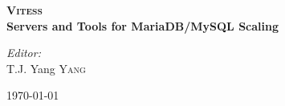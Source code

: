 \begin{titlepage}
 
\begin{center}
 
 
\textsc{\huge \bfseries Vitess}\\[4.5cm]

 
 
 

{ \large  \bfseries Servers and Tools for MariaDB/MySQL Scaling}
\\[8.0cm]
 
 
\begin{minipage}{0.4\textwidth}
\begin{center} \large
\emph{Editor:}\\
T.J. Yang \textsc{Yang}
\end{center}
\end{minipage}
 
\vfill
{\large \today}
 
\end{center}
 
\end{titlepage}

